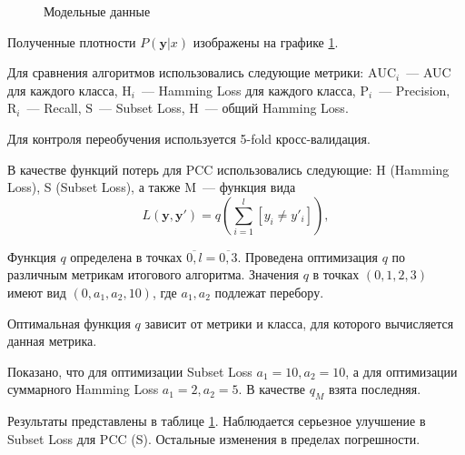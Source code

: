 \documentclass[12pt,twoside]{article}
\newcommand{\y}{\mathbf{y}}
\begin{document}

\begin{figure}[h]
	\caption{Модельные данные}
	\label{fg:ModelData}
\end{figure}

Полученные плотности $P(\y|x)$ изображены на графике \ref{fg:ModelData}.

Для сравнения алгоритмов использовались следующие метрики: $\mbox{AUC}_i$~--- AUC для каждого класса, $\mbox{H}_i$~--- Hamming Loss для каждого класса, $\mbox{P}_i$~--- Precision, $\mbox{R}_i$~--- Recall, $\mbox{S}$~--- Subset Loss, $\mbox{H}$~--- общий Hamming Loss.

Для контроля переобучения используется 5-fold кросс-валидация.

В качестве функций потерь для PCC использовались следующие: H (Hamming Loss), S (Subset Loss), а также M~--- функция вида
$$L(\y,\y')=q\left(\sum\limits_{i=1}^l[y_i\neq y'_i]\right),$$

Функция $q$ определена в точках $\overline{0,l}=\overline{0,3}$. Проведена оптимизация $q$ по различным метрикам итогового алгоритма. Значения $q$ в точках $(0,1,2,3)$ имеют вид $(0,a_1,a_2,10)$, где $a_1,a_2$ подлежат перебору.

Оптимальная функция $q$ зависит от метрики и класса, для которого вычисляется данная метрика.

Показано, что для оптимизации Subset Loss $a_1=10,a_2=10$, а для оптимизации суммарного Hamming Loss $a_1=2, a_2=5$. В качестве $q_M$ взята последняя.

Результаты представлены в таблице \ref{fg:ModelData}. Наблюдается серьезное улучшение в Subset Loss для PCC (S). Остальные изменения в пределах погрешности.
\end{document}
